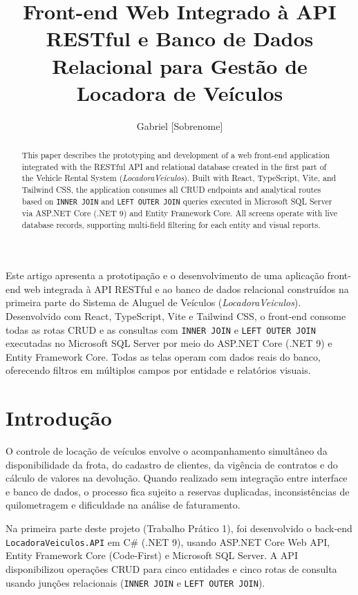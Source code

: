 \documentclass[12pt]{article}
\title{Front-end Web Integrado à API RESTful e Banco de Dados Relacional para Gestão de Locadora de Veículos}
\author{Gabriel [Sobrenome]\inst{1}}
\begin{document}
\maketitle

\begin{abstract}
  This paper describes the prototyping and development of a web front-end application integrated with the RESTful API and relational database created in the first part of the Vehicle Rental System (\textit{LocadoraVeiculos}). Built with React, TypeScript, Vite, and Tailwind CSS, the application consumes all CRUD endpoints and analytical routes based on \texttt{INNER JOIN} and \texttt{LEFT OUTER JOIN} queries executed in Microsoft SQL Server via ASP.NET Core (.NET 9) and Entity Framework Core. All screens operate with live database records, supporting multi-field filtering for each entity and visual reports.
\end{abstract}

\begin{resumo}
  Este artigo apresenta a prototipação e o desenvolvimento de uma aplicação front-end web integrada à API RESTful e ao banco de dados relacional construídos na primeira parte do Sistema de Aluguel de Veículos (\textit{LocadoraVeiculos}). Desenvolvido com React, TypeScript, Vite e Tailwind CSS, o front-end consome todas as rotas CRUD e as consultas com \texttt{INNER JOIN} e \texttt{LEFT OUTER JOIN} executadas no Microsoft SQL Server por meio do ASP.NET Core (.NET 9) e Entity Framework Core. Todas as telas operam com dados reais do banco, oferecendo filtros em múltiplos campos por entidade e relatórios visuais.
\end{resumo}

\section{Introdução}

O controle de locação de veículos envolve o acompanhamento simultâneo da disponibilidade da frota, do cadastro de clientes, da vigência de contratos e do cálculo de valores na devolução. Quando realizado sem integração entre interface e banco de dados, o processo fica sujeito a reservas duplicadas, inconsistências de quilometragem e dificuldade na análise de faturamento.

Na primeira parte deste projeto (Trabalho Prático 1), foi desenvolvido o back-end \texttt{LocadoraVeiculos.API} em C\# (.NET 9), usando ASP.NET Core Web API, Entity Framework Core (Code-First) e Microsoft SQL Server. A API disponibilizou operações CRUD para cinco entidades e cinco rotas de consulta usando junções relacionais (\texttt{INNER JOIN} e \texttt{LEFT OUTER JOIN}).
\end{document}
